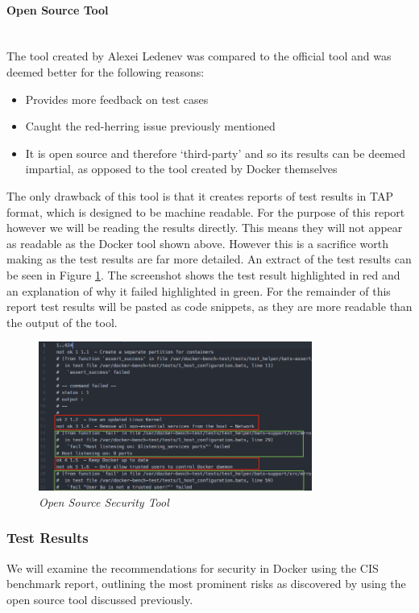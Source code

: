 \documentclass{article}
\begin{document}
\paragraph{Open Source Tool}\mbox{}\\
The tool created by Alexei Ledenev was compared to the official tool and was deemed better for the following reasons:

\begin{itemize}
  \item Provides more feedback on test cases
  \item Caught the red-herring issue previously mentioned
  \item It is open source and therefore `third-party' and so its results can be deemed impartial, as opposed to the tool created by Docker themselves
\end{itemize}

The only drawback of this tool is that it creates reports of test results in TAP format, which is designed to be machine readable. For the purpose of this report however we will be reading the results directly. This means they will not appear as readable as the Docker tool shown above. However this is a sacrifice worth making as the test results are far more detailed. An extract of the test results can be seen in Figure \ref{fig:sec_tool}. The screenshot shows the test result highlighted in red and an explanation of why it failed highlighted in green. For the remainder of this report test results will be pasted as code snippets, as they are more readable than the output of the tool.

\begin{figure}[!h]
\centering
\includegraphics*[width=0.8\textwidth]{components/images/open-source-results}
\caption{\em Open Source Security Tool}
\label{fig:sec_tool}
\end{figure}

\newpage
\subsubsection{Test Results}
We will examine the recommendations for security in Docker using the CIS benchmark report, outlining the most prominent risks as discovered by using the open source tool discussed previously. 
\end{document}
